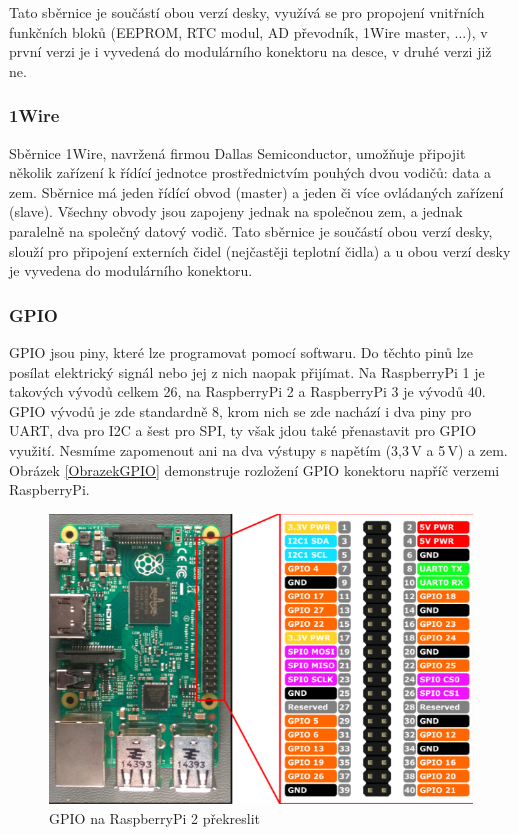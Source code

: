 Tato sběrnice je součástí obou verzí desky, využívá se pro propojení vnitřních funkčních bloků (EEPROM, RTC modul, AD převodník, 1Wire master, ...), v první verzi je i vyvedená do modulárního konektoru na desce, v druhé verzi již ne.

\subsubsection{1Wire}
Sběrnice 1Wire, navržená firmou Dallas Semiconductor, umožňuje připojit několik zařízení k řídící jednotce prostřednictvím pouhých dvou vodičů: data a zem. Sběrnice má jeden řídící obvod (master) a jeden či více ovládaných zařízení (slave). Všechny obvody jsou zapojeny jednak na společnou zem, a jednak paralelně na společný datový vodič. Tato sběrnice je součástí obou verzí desky, slouží pro připojení externích čidel (nejčastěji teplotní čidla) a u obou verzí desky je vyvedena do modulárního konektoru.

\subsubsection{GPIO}
\label{KapGPIO}
GPIO jsou piny, které lze programovat pomocí softwaru. Do těchto pinů lze posílat elektrický signál nebo jej z nich naopak přijímat. Na RaspberryPi 1 je takových vývodů celkem 26, na RaspberryPi 2 a RaspberryPi 3 je vývodů 40. GPIO vývodů je zde standardně 8, krom nich se zde nachází i dva piny pro UART, dva pro I2C a šest pro SPI, ty však jdou také přenastavit pro GPIO využití. Nesmíme zapomenout ani na dva výstupy s napětím (3,3\,V a 5\,V) a zem.
Obrázek \ref{ObrazekGPIO} demonstruje rozložení GPIO konektoru napříč verzemi RaspberryPi.

 \begin{figure}[!h]
  \begin{center}
    \includegraphics[scale=0.4]{obrazky/sbernice_gpio}
  \end{center}
  \caption{GPIO na RaspberryPi 2 \colorbox[rgb]{0,1,0}{překreslit}}
\end{figure}

